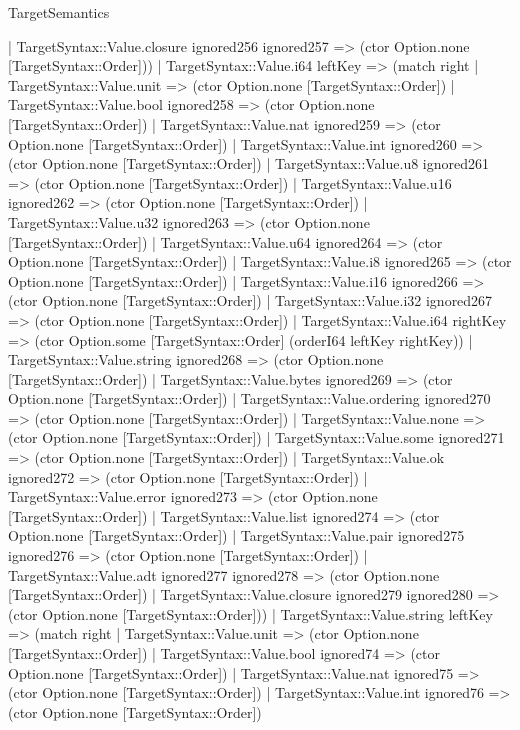 \begin{lexlean}{TargetSemantics}
\begin{semanticmodule}
{      | TargetSyntax::Value.closure ignored256 ignored257 => (ctor Option.none [TargetSyntax::Order]))
    | TargetSyntax::Value.i64 leftKey => (match right
      | TargetSyntax::Value.unit => (ctor Option.none [TargetSyntax::Order])
      | TargetSyntax::Value.bool ignored258 => (ctor Option.none [TargetSyntax::Order])
      | TargetSyntax::Value.nat ignored259 => (ctor Option.none [TargetSyntax::Order])
      | TargetSyntax::Value.int ignored260 => (ctor Option.none [TargetSyntax::Order])
      | TargetSyntax::Value.u8 ignored261 => (ctor Option.none [TargetSyntax::Order])
      | TargetSyntax::Value.u16 ignored262 => (ctor Option.none [TargetSyntax::Order])
      | TargetSyntax::Value.u32 ignored263 => (ctor Option.none [TargetSyntax::Order])
      | TargetSyntax::Value.u64 ignored264 => (ctor Option.none [TargetSyntax::Order])
      | TargetSyntax::Value.i8 ignored265 => (ctor Option.none [TargetSyntax::Order])
      | TargetSyntax::Value.i16 ignored266 => (ctor Option.none [TargetSyntax::Order])
      | TargetSyntax::Value.i32 ignored267 => (ctor Option.none [TargetSyntax::Order])
      | TargetSyntax::Value.i64 rightKey => (ctor Option.some [TargetSyntax::Order] (orderI64 leftKey rightKey))
      | TargetSyntax::Value.string ignored268 => (ctor Option.none [TargetSyntax::Order])
      | TargetSyntax::Value.bytes ignored269 => (ctor Option.none [TargetSyntax::Order])
      | TargetSyntax::Value.ordering ignored270 => (ctor Option.none [TargetSyntax::Order])
      | TargetSyntax::Value.none => (ctor Option.none [TargetSyntax::Order])
      | TargetSyntax::Value.some ignored271 => (ctor Option.none [TargetSyntax::Order])
      | TargetSyntax::Value.ok ignored272 => (ctor Option.none [TargetSyntax::Order])
      | TargetSyntax::Value.error ignored273 => (ctor Option.none [TargetSyntax::Order])
      | TargetSyntax::Value.list ignored274 => (ctor Option.none [TargetSyntax::Order])
      | TargetSyntax::Value.pair ignored275 ignored276 => (ctor Option.none [TargetSyntax::Order])
      | TargetSyntax::Value.adt ignored277 ignored278 => (ctor Option.none [TargetSyntax::Order])
      | TargetSyntax::Value.closure ignored279 ignored280 => (ctor Option.none [TargetSyntax::Order]))
    | TargetSyntax::Value.string leftKey => (match right
      | TargetSyntax::Value.unit => (ctor Option.none [TargetSyntax::Order])
      | TargetSyntax::Value.bool ignored74 => (ctor Option.none [TargetSyntax::Order])
      | TargetSyntax::Value.nat ignored75 => (ctor Option.none [TargetSyntax::Order])
      | TargetSyntax::Value.int ignored76 => (ctor Option.none [TargetSyntax::Order])
}
\end{semanticmodule}
\end{lexlean}
